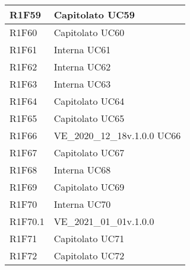 \begin{center}
\begin{longtable}{|p{22mm}|p{44mm}|}
		R1F59 &
		Capitolato \newline
		UC59 
		\\
		\hline
		
		R1F60 &
		Capitolato \newline
		UC60 
		\\
		\hline
		
		R1F61 &
		Interna \newline
		UC61 
		\\
		\hline
		
		R1F62 &
		Interna \newline
		UC62 
		\\
		\hline
		
		R1F63 &
		Interna \newline
		UC63 
		\\
		\hline
		
		R1F64 &
		Capitolato \newline
		UC64 
		\\
		\hline
		
		R1F65 &
		Capitolato \newline
		UC65 
		\\
		\hline
		
		R1F66 &
		VE\_2020\_12\_18v.1.0.0 \newline
		UC66 
		\\
		\hline
		
		R1F67 &
		Capitolato \newline
		UC67 
		\\
		\hline
		
		R1F68 &
		Interna \newline
		UC68 
		\\
		\hline
		
		R1F69 &
		Capitolato \newline
		UC69 
		\\
		\hline
		
		R1F70 &
		Interna \newline
		UC70 
		\\
		\hline
		
		R1F70.1 &
		VE\_2021\_01\_01v.1.0.0 
		\\
		\hline
		
		R1F71 &
		Capitolato \newline
		UC71 
		\\
		\hline
		
		R1F72 &
		Capitolato \newline
		UC72 
		\\
		\hline
		

\end{longtable}
\end{center}
